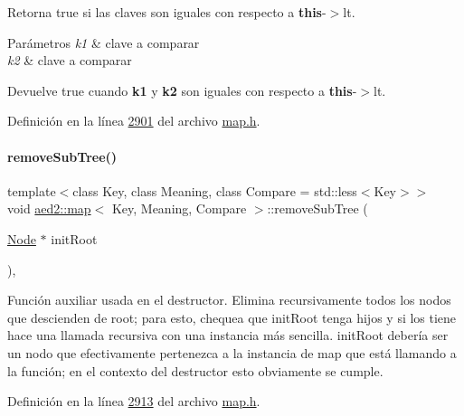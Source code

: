 Retorna true si las claves son iguales con respecto a {\bfseries this}-\/$>$lt. 


\begin{DoxyParams}{Parámetros}
{\em k1} & clave a comparar \\
\hline
{\em k2} & clave a comparar \\
\hline
\end{DoxyParams}
\begin{DoxyReturn}{Devuelve}
true cuando {\bfseries k1} y {\bfseries k2} son iguales con respecto a {\bfseries this}-\/$>$lt. 
\end{DoxyReturn}


Definición en la línea \hyperlink{map_8h_source_l02901}{2901} del archivo \hyperlink{map_8h_source}{map.\+h}.

\mbox{\label{classaed2_1_1map_a533bd88d0b7a584e3c968548d246c255_a533bd88d0b7a584e3c968548d246c255}} 
\paragraph{\texorpdfstring{remove\+Sub\+Tree()}{removeSubTree()}}
{\footnotesize\ttfamily template$<$class Key, class Meaning, class Compare = std\+::less$<$\+Key$>$$>$ \\
void \hyperlink{classaed2_1_1map}{aed2\+::map}$<$ Key, Meaning, Compare $>$\+::remove\+Sub\+Tree (\begin{DoxyParamCaption}\item[{\hyperlink{structaed2_1_1map_1_1Node}{Node} $\ast$}]{init\+Root }\end{DoxyParamCaption})\hspace{0.3cm}{\ttfamily [inline]}, {\ttfamily [private]}}



Función auxiliar usada en el destructor. Elimina recursivamente todos los nodos que descienden de root; para esto, chequea que init\+Root tenga hijos y si los tiene hace una llamada recursiva con una instancia más sencilla. init\+Root debería ser un nodo que efectivamente pertenezca a la instancia de map que está llamando a la función; en el contexto del destructor esto obviamente se cumple. 



Definición en la línea \hyperlink{map_8h_source_l02913}{2913} del archivo \hyperlink{map_8h_source}{map.\+h}.



